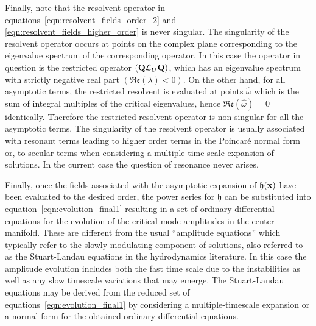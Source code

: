 Finally, note that the resolvent operator in equations~\eqref{eqn:resolvent_fields_order_2} and \eqref{eqn:resolvent_fields_higher_order} is never singular. The singularity of the resolvent operator occurs at points on the complex plane corresponding to the eigenvalue spectrum of the corresponding operator. In this case the operator in question is the restricted operator $(\mathbf{Q}\mathcal{L}_{\boldsymbol{U}}\mathbf{Q})$, which has an eigenvalue spectrum with strictly negative real part $(\mathfrak{Re}(\lambda) < 0)$. On the other hand, for all asymptotic terms, the restricted resolvent is evaluated at points $\widehat{\omega}$ which is the sum of integral multiples of the critical eigenvalues, hence $\mathfrak{Re}(\widehat{\omega}) = 0$ identically. Therefore the restricted resolvent operator is non-singular for all the asymptotic terms. The singularity of the resolvent operator is usually associated with resonant terms leading to higher order terms in the Poincar\'{e} normal form or, to secular terms when considering a multiple time-scale expansion of solutions. In the current case the question of resonance never arises. 

Finally, once the fields associated with the asymptotic expansion of $\mathfrak{h}(\mathbf{x})$ have been evaluated to the desired order, the power series for $\mathfrak{h}$ can be substituted into equation~\eqref{eqn:evolution_final1} resulting in a set of ordinary differential equations for the evolution of the critical mode amplitudes in the center-manifold. These are different from the usual ``amplitude equations'' \cite{newell69,cross80,cross09} which typically refer to the slowly modulating component of solutions, also referred to as the Stuart-Landau equations \citep{stuart58,stuart60,sipp07} in the hydrodynamics literature. In this case the amplitude evolution includes both the fast time scale due to the instabilities as well as any slow timescale variations that may emerge. The Stuart-Landau equations may be derived from the reduced set of equations~\eqref{eqn:evolution_final1} by considering a multiple-timescale expansion or a normal form for the obtained ordinary differential equations. 













